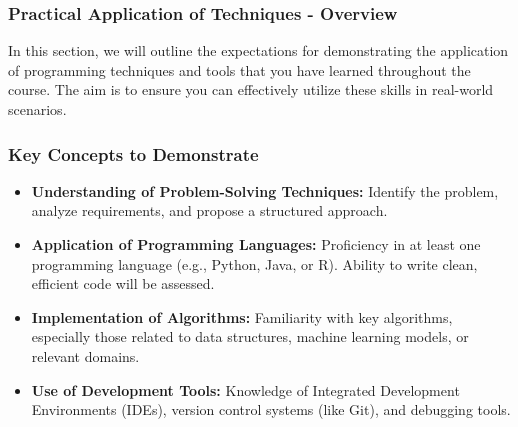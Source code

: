 \documentclass[aspectratio=169]{beamer}
\begin{document}
\begin{frame}[fragile]
    \frametitle{Practical Application of Techniques - Overview}
    In this section, we will outline the expectations for demonstrating the application of programming techniques and tools that you have learned throughout the course. The aim is to ensure you can effectively utilize these skills in real-world scenarios.
\end{frame}

\begin{frame}[fragile]
    \frametitle{Key Concepts to Demonstrate}
    \begin{itemize}
        \item \textbf{Understanding of Problem-Solving Techniques:} 
        Identify the problem, analyze requirements, and propose a structured approach.
        
        \item \textbf{Application of Programming Languages:} 
        Proficiency in at least one programming language (e.g., Python, Java, or R). 
        Ability to write clean, efficient code will be assessed.

        \item \textbf{Implementation of Algorithms:} 
        Familiarity with key algorithms, especially those related to data structures, machine learning models, or relevant domains.

        \item \textbf{Use of Development Tools:} 
        Knowledge of Integrated Development Environments (IDEs), version control systems (like Git), and debugging tools.
    \end{itemize}
\end{frame}
\end{document}
